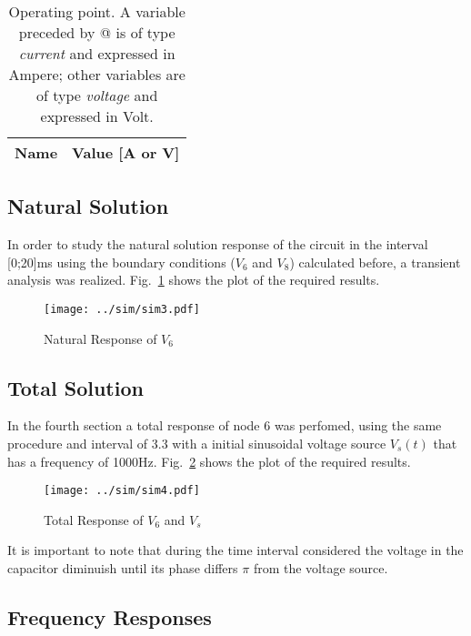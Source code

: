 \pagebreak
\begin{table}[!ht]
  \centering
  \begin{tabular}{|l|r|}
    \hline    
    {\bf Name} & {\bf Value [A or V]} \\ \hline
    
  \end{tabular}
  \caption{Operating point. A variable preceded by @ is of type {\em current}
    and expressed in Ampere; other variables are of type {\it voltage} and expressed in
    Volt.}
  \label{tab:op2}
\end{table}


\subsection{Natural Solution}
In order to study the natural solution response of the circuit in the interval [0;20]ms using the boundary conditions ($V_{6}$ and $V_{8}$) calculated before, a transient analysis was realized. 
Fig.~\ref{fig:sim3} shows the plot of the required results.
\newline
\newline
\newline

\begin{figure}[H] \centering
\texttt{[image: ../sim/sim3.pdf]}
\caption{Natural Response of $V_{6}$} 
\label{fig:sim3}
\end{figure}


\pagebreak

\subsection{Total Solution}

In the fourth section a total response of node 6 was perfomed, using the same procedure and interval of 3.3 with a initial sinusoidal voltage source $V_{s}(t)$ that has a frequency of 1000Hz. 
Fig.~\ref{fig:sim4} shows the plot of the required results.

\begin{figure}[H] \centering
\texttt{[image: ../sim/sim4.pdf]}
\caption{Total Response of $V_{6}$ and $V_{s}$}
\label{fig:sim4}
\end{figure}


It is important to note that during the time interval considered the voltage in the capacitor diminuish until its phase differs $\pi$ from the voltage source.


\subsection{Frequency Responses}

